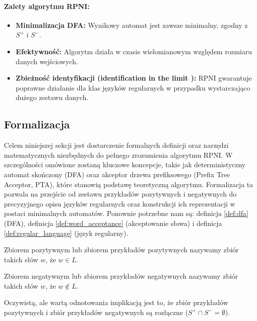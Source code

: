 \paragraph*{Zalety algorytmu RPNI:}
\begin{itemize}
    \item \textbf{Minimalizacja DFA:} Wynikowy automat jest zawsze minimalny, zgodny z \( S^+ \) i \( S^- \).
    \item \textbf{Efektywność:} Algorytm działa w czasie wielomianowym względem rozmiaru danych wejściowych.
    \item \textbf{Zbieżność identyfikacji (identification in the limit \cite{GOLD1967447}):} RPNI gwarantuje poprawne działanie dla klas języków regularnych w przypadku wystarczająco dużego zestawu danych.
\end{itemize}

\subsection{Formalizacja}

Celem niniejszej sekcji jest dostarczenie formalnych definicji oraz narzędzi matematycznych niezbędnych do pełnego zrozumienia algorytmu RPNI. W szczególności omówione zostaną kluczowe koncepcje, takie jak deterministyczny automat skończony (DFA) oraz akceptor drzewa prefiksowego (Prefix Tree Acceptor, PTA), które stanowią podstawę teoretyczną algorytmu. Formalizacja ta pozwala na przejście od zestawu przykładów pozytywnych i negatywnych do precyzyjnego opisu języków regularnych oraz konstrukcji ich reprezentacji w postaci minimalnych automatów. Ponownie potrzebne nam są: definicja \ref{def:dfa} (DFA), definicja \ref{def:word_acceptance} (akceptowanie słowa) i definicja \ref{def:regular_language} (język regularny).

\begin{definition}
    Zbiorem pozytywnym lub zbiorem przykładów pozytywnych nazywamy zbiór takich słów $w$, że \( w \in L \).
\end{definition}

\begin{definition}
    Zbiorem negatywnym lub zbiorem przykładów negatywnych nazywamy zbiór takich słów $w$, że \( w \notin L \).
\end{definition}

Oczywistą, ale wartą odnotowania implikacją jest to, że zbiór przykładów pozytywnych i zbiór przykładów negatywnych są rozłączne (\( S^+ \cap S^- = \emptyset \)).

